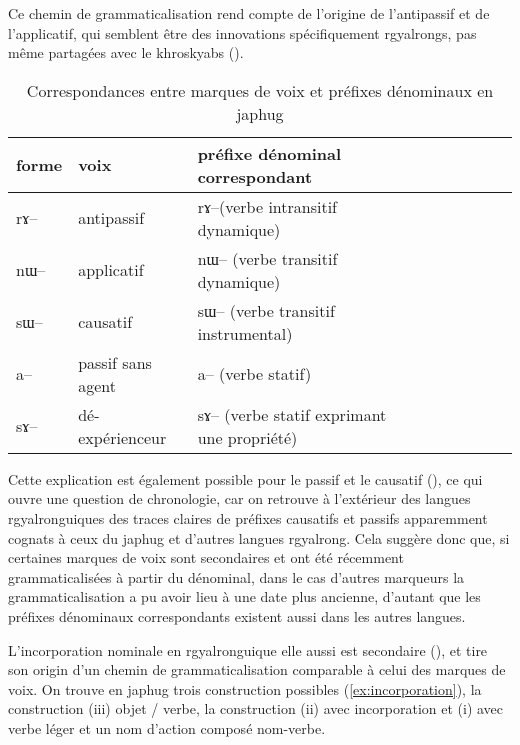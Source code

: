 \documentclass[oldfontcommands,oneside,a4paper,11pt]{article}
\newcommand{\ipa}[1]{{\phon \mbox{#1}}} %
\begin{document}
Ce chemin de grammaticalisation rend compte de l'origine de l'antipassif et de l'applicatif, qui semblent être des innovations spécifiquement rgyalrongs, pas même partagées avec le khroskyabs  (\citealt{jacques14antipassive}).


 
 
\begin{table}[h]
\caption{Correspondances entre marques de voix et préfixes dénominaux en japhug} \centering \label{tab:denominal}
\begin{tabular}{lllllllll} \toprule
forme & voix & préfixe dénominal correspondant \\
\midrule
\ipa{rɤ}-- & antipassif &    \ipa{rɤ}--(verbe intransitif dynamique) \\
\ipa{nɯ}-- & applicatif &    \ipa{nɯ}-- (verbe transitif dynamique) \\
\ipa{sɯ}-- & causatif &    \ipa{sɯ}-- (verbe transitif instrumental)\\
\ipa{a}-- & passif sans agent &    \ipa{a}-- (verbe statif) \\
\ipa{sɤ}--  & dé-expérienceur &    \ipa{sɤ}-- (verbe statif exprimant une propriété)\\
    \bottomrule
\end{tabular}
\end{table}


Cette explication est également possible pour le passif et le causatif   (\citealt{jacques15causative}), ce qui ouvre une question de chronologie, car on retrouve à l'extérieur des langues rgyalronguiques des traces claires de préfixes causatifs et passifs apparemment cognats à ceux du japhug et d'autres langues rgyalrong. Cela suggère donc que, si certaines marques de voix sont secondaires et ont été récemment grammaticalisées à partir du dénominal, dans le cas d'autres marqueurs la grammaticalisation a pu avoir lieu à une date plus ancienne, d'autant que les préfixes dénominaux correspondants existent aussi dans les autres langues.

L'incorporation nominale en rgyalronguique elle aussi est secondaire  (\citealt{jacques12incorp, lai13affixale}), et tire son origin d'un chemin de grammaticalisation comparable à celui des marques de voix. On trouve en japhug trois construction possibles (\ref{ex:incorporation}), la construction (iii) objet / verbe, la construction (ii) avec incorporation et (i) avec verbe léger et un nom d'action composé nom-verbe.
\end{document}
